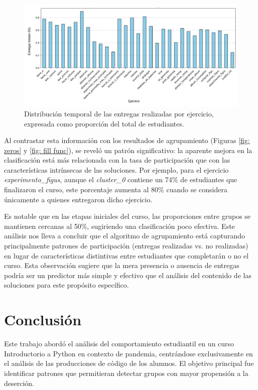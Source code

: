 \documentclass[11pt,a4paper,twoside,openany]{tesis}
\begin{document}
\begin{figure}[H]
    \centering
    \includegraphics[width=\textwidth]{imagenes/proporcion - entregas (1).png}
    \caption{Distribución temporal de las entregas realizadas por ejercicio, expresada como proporción del total de estudiantes.}
\end{figure}

Al contrastar esta información con los resultados de agrupamiento (Figuras \ref{fig: zeros} y \ref{fig: fill func}), se reveló un patrón significativo: la aparente mejora en la clasificación está más relacionada con la tasa de participación que con las características intrínsecas de las soluciones. Por ejemplo, para el ejercicio \emph{experimento\_figus}, aunque el \emph{cluster\_0} contiene un 74\% de estudiantes que finalizaron el curso, este porcentaje aumenta al 80\% cuando se considera únicamente a quienes entregaron dicho ejercicio.

Es notable que en las etapas iniciales del curso, las proporciones entre grupos se mantienen cercanas al 50\%, sugiriendo una clasificación poco efectiva. Este análisis nos lleva a concluir que el algoritmo de agrupamiento está capturando principalmente patrones de participación (entregas realizadas vs. no realizadas) en lugar de características distintivas entre estudiantes que completarán o no el curso. Esta observación sugiere que la mera presencia o ausencia de entregas podría ser un predictor más simple y efectivo que el análisis del contenido de las soluciones para este propósito específico.

\chapter{Conclusión}

Este trabajo abordó el análisis del comportamiento estudiantil en un curso Introductorio a Python en contexto de pandemia, centrándose exclusivamente en el análisis de las producciones de código de los alumnos. El objetivo principal fue identificar patrones que permitieran detectar grupos con mayor propensión a la deserción.
\end{document}
